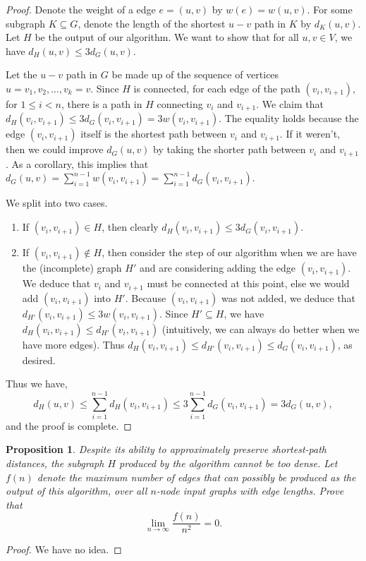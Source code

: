 \documentclass[10pt]{article}
\newtheorem{proposition}[lemma]{Proposition}
\begin{document}
\begin{proof}
  Denote the weight of a edge \(e = (u, v)\) by \(w(e) = w(u, v)\). For some subgraph \(K \subseteq G\), denote the length of the shortest \(u - v\) path in \(K\) by \(d_K(u, v)\). Let \(H\) be the output of our algorithm. We want to show that for all \(u, v \in V\), we have \(d_H(u, v) \le 3 d_G(u, v)\). 
  
  Let the \(u - v\) path in \(G\) be made up of the sequence of vertices \(u = v_1, v_2, \dots, v_k = v\). Since \(H\) is connected, for each edge of the path \((v_i, v_{i+1})\), for \(1 \leq i < n\), there is a path in \(H\) connecting \(v_i\) and \(v_{i + 1}\). We claim that \(d_H(v_i, v_{i + 1}) \leq 3 d_G(v_i, v_{i + 1}) = 3 w(v_i, v_{i + 1})\). The equality holds because the edge \((v_i, v_{i + 1})\) itself is the shortest path between \(v_i\) and \(v_{i+1}\). If it weren't, then we could improve \(d_G(u, v)\) by taking the shorter path between \(v_i\) and \(v_{i + 1}\). As a corollary, this implies that \(d_G(u, v) = \sum_{i = 1}^{n - 1} w(v_i, v_{i + 1}) = \sum_{i = 1}^{n - 1} d_G(v_i, v_{i + 1})\).
  
  We split into two cases. 
  \begin{enumerate}
    \item If \((v_i, v_{i + 1}) \in H\), then clearly \(d_H(v_i, v_{i + 1}) \leq 3 d_G(v_i, v_{i + 1})\).
    \item If \((v_i, v_{i + 1}) \notin H\), then consider the step of our algorithm when we are have the (incomplete) graph \(H'\) and are considering adding the edge \((v_i, v_{i + 1})\). We deduce that \(v_i\) and \(v_{i + 1}\) must be connected at this point, else we would add \((v_i, v_{i+1})\) into \(H'\). Because \((v_i, v_{i + 1})\) was not added, we deduce that \(d_{H'}(v_i, v_{i + 1}) \le  3 w(v_i, v_{i + 1})\). Since \(H' \subseteq H\), we have \(d_{H}(v_i, v_{i + 1}) \le d_{H'}(v_i, v_{i + 1})\) (intuitively, we can always do better when we have more edges). Thus \(d_{H}(v_i, v_{i + 1}) \le d_{H'}(v_i, v_{i + 1}) \le d_{G}(v_i, v_{i + 1})\), as desired.
  \end{enumerate}

  Thus we have,
  \[d_H(u, v) \le \sum_{i = 1}^{n - 1}d_H(v_i, v_{i + 1}) \le 3 \sum_{i = 1}^{n - 1} d_G(v_i, v_{i + 1}) = 3 d_G(u, v),\]
  and the proof is complete.
\end{proof}

\begin{proposition}
  Despite its ability to approximately preserve shortest-path distances, the subgraph \(H\) produced by the algorithm cannot be too dense. Let \(f(n)\) denote the maximum number of edges that can possibly be produced as the output of this algorithm, over all \(n\)-node input graphs with edge lengths. Prove that
  \[\lim_{n \to \infty} \frac{f(n)}{n^2} = 0.\]
\end{proposition}

\begin{proof}
  We have no idea. 
\end{proof}
\end{document}
